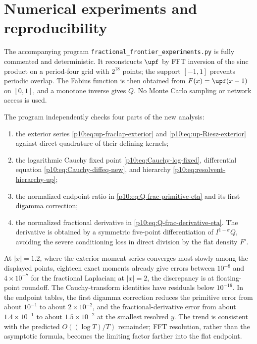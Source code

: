 \documentclass[11pt,oneside]{article}
\theoremstyle{definition}
\theoremstyle{remark}
\newcommand{\F}{F}
\newcommand{\Q}{Q}
\newcommand{\1}{\mathbf 1}
\begin{document}
\section{Numerical experiments and reproducibility}
\label{p10:sec:numerics-new}\label{p10:sec:numerics}

The accompanying program \texttt{fractional\_frontier\_experiments.py} is fully
commented and deterministic.  It reconstructs \(\upf\) by FFT inversion of the sinc
product on a period-four grid with \(2^{18}\) points; the support \([-1,1]\) prevents
periodic overlap.  The Fabius function is then obtained from
\(\F(x)=\upf(x-1)\) on \([0,1]\), and a monotone inverse gives \(\Q\).
No Monte Carlo sampling or network access is used.

The program independently checks four parts of the new analysis:
\begin{enumerate}
\item the exterior series \eqref{p10:eq:up-fraclap-exterior} and
\eqref{p10:eq:up-Riesz-exterior} against direct quadrature of their defining kernels;
\item the logarithmic Cauchy fixed point \eqref{p10:eq:Cauchy-log-fixed}, differential
equation \eqref{p10:eq:Cauchy-diffeq-new}, and hierarchy
\eqref{p10:eq:resolvent-hierarchy-up};
\item the normalized endpoint ratio in
\eqref{p10:eq:Q-frac-primitive-eta} and its first digamma correction;
\item the normalized fractional derivative in
\eqref{p10:eq:Q-frac-derivative-eta}.  The derivative is obtained by a symmetric
five-point differentiation of \(I^{1-\sigma}\Q\), avoiding the severe conditioning
loss in direct division by the flat density \(\F'\).
\end{enumerate}

\begingroup
\setlength{\tabcolsep}{5pt}

\endgroup

At \(|x|=1.2\), where the exterior moment series converges most slowly among the
displayed points, eighteen exact moments already give errors between
\(10^{-8}\) and \(4\times10^{-7}\) for the fractional Laplacian; at \(|x|=2\),
the discrepancy is at floating-point roundoff.  The Cauchy-transform identities have
residuals below \(10^{-16}\).  In the endpoint tables, the first digamma correction
reduces the primitive error from about \(10^{-1}\) to about \(2\times10^{-2}\), and
the fractional-derivative error from about \(1.4\times10^{-1}\) to about
\(1.5\times10^{-2}\) at the smallest resolved \(y\).  The trend is consistent with
the predicted \(O((\log T)/T)\) remainder; FFT resolution, rather than the asymptotic
formula, becomes the limiting factor farther into the flat endpoint.
\end{document}
